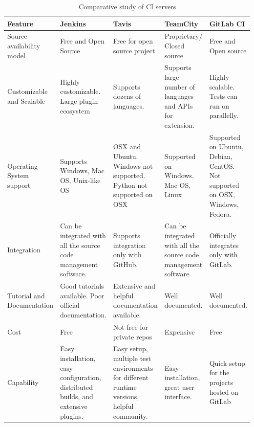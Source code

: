 \documentclass[10pt]{ruthesis}
\begin{document}
\begin{table}
\begin{center}
\def\arraystretch{2}
\begin{tabular}{|p{3cm}|p{3cm}|p{3cm}|p{3cm}|p{3cm}|}
\hline
\rule{0pt}{15pt} \textbf{Feature} & \textbf{Jenkins} & \textbf{Tavis} & \textbf{TeamCity} & \textbf{GitLab CI} \\[2ex]
\hline
Source availability model &  Free and Open Source & Free for open source project & Proprietary/ Closed source &  Free and Open source\\
\hline

Customizable and Scalable & Highly customizable. Large plugin ecosystem & Supports dozens of languages. & Supports large number of languages and APIs for extension. & Highly scalable. Tests can run on parallelly.\\
\hline

Operating System support & Supports Windows, Mac OS, Unix-like OS & OSX and Ubuntu. Windows not supported. Python not supported on OSX & Supported on Windows, Mac OS, Linux & Supported on Ubuntu, Debian, CentOS. Not supported on OSX, Windows, Fedora. \\
\hline

Integration & Can be integrated with all the source code management software. & Supports integration only with GitHub. &  Can be integrated with all the source code management software. & Officially integrates only with GitLab. \\
\hline

Tutorial and Documentation & Good tutorials available. Poor official documentation. &  Extensive and helpful documentation available. & Well documented. & Well documented.\\
\hline

Cost & Free & Not free for private repos & Expensive & Free \\
\hline

Capability & Easy installation, easy configuration, distributed builds, and extensive plugins. & Easy setup, multiple test environments for different runtime versions, helpful community. & Easy installation, great user interface. & Quick setup for the projects hosted on GitLab\\
\hline

\end{tabular}
\end{center}
\caption{Comparative study of CI servers}
\label{cicompare}
\end{table}
\end{document}
